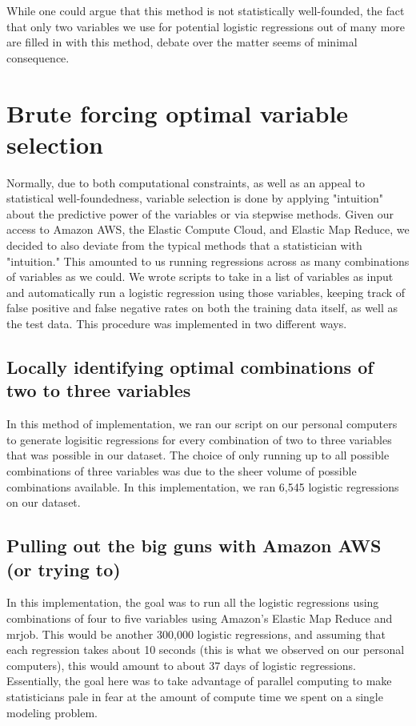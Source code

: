 \documentclass[11pt]{article}
\begin{document}
While one could argue that this method is not statistically well-founded, the fact that only two variables we use for potential logistic regressions out of many more are filled in with this method, debate over the matter seems of minimal consequence.

\section{Brute forcing optimal variable selection}
Normally, due to both computational constraints, as well as an appeal to statistical well-foundedness, variable selection is done by applying "intuition" about the predictive power of the variables or via stepwise methods. Given our access to Amazon AWS, the Elastic Compute Cloud, and Elastic Map Reduce, we decided to also deviate from the typical methods that a statistician with "intuition." This amounted to us running regressions across as many combinations of variables as we could. We wrote scripts to take in a list of variables as input and automatically run a logistic regression using those variables, keeping track of false positive and false negative rates on both the training data itself, as well as the test data. This procedure was implemented in two different ways.

\subsection{Locally identifying optimal combinations of two to three variables}
In this method of implementation, we ran our script on our personal computers to generate logisitic regressions for every combination of two to three variables that was possible in our dataset. The choice of only running up to all possible combinations of three variables was due to the sheer volume of possible combinations available. In this implementation, we ran 6,545 logistic regressions on our dataset.

\subsection{Pulling out the big guns with Amazon AWS (or trying to)}
In this implementation, the goal was to run all the logistic regressions using combinations of four to five variables using Amazon's Elastic Map Reduce and mrjob. This would be another 300,000 logistic regressions, and assuming that each regression takes about 10 seconds (this is what we observed on our personal computers), this would amount to about 37 days of logistic regressions. Essentially, the goal here was to take advantage of parallel computing to make statisticians pale in fear at the amount of compute time we spent on a single modeling problem.
\end{document}
